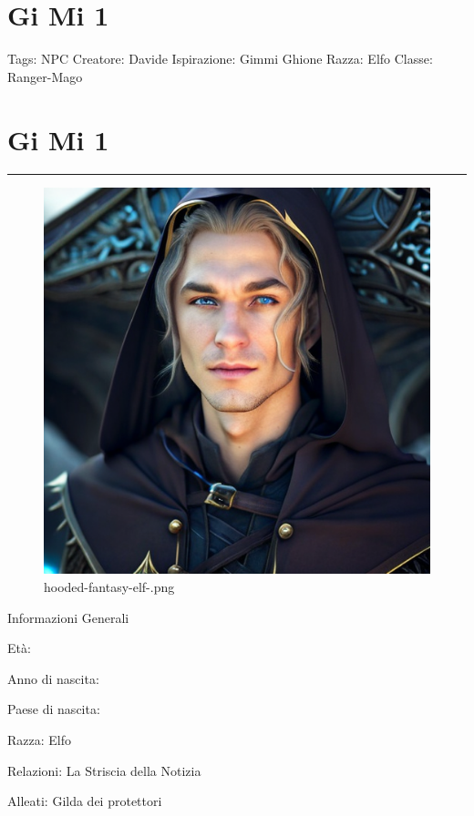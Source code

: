 \section{Gi Mi 1}\label{gi-mi-1}

Tags: NPC Creatore: Davide Ispirazione: Gimmi Ghione Razza: Elfo Classe:
Ranger-Mago

\section{Gi Mi 1}\label{gi-mi-1-1}

\begin{center}\rule{0.5\linewidth}{0.5pt}\end{center}

\begin{figure}
\centering
\includegraphics{hooded-fantasy-elf-.png}
\caption{hooded-fantasy-elf-.png}
\end{figure}

Informazioni Generali

Età:

Anno di nascita:

Paese di nascita:

Razza: Elfo

Relazioni: La Striscia della Notizia

Alleati: Gilda dei protettori

